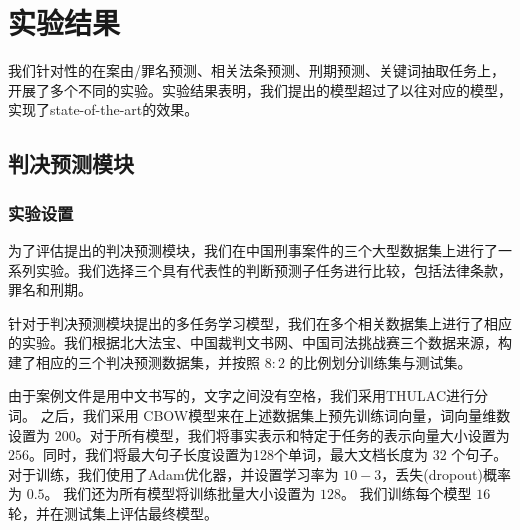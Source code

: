\chapter{实验结果}
\label{cha:result}

我们针对性的在案由/罪名预测、相关法条预测、刑期预测、关键词抽取任务上，开展了多个不同的实验。实验结果表明，我们提出的模型超过了以往对应的模型，实现了state-of-the-art的效果。

\section{判决预测模块}
\subsection{实验设置}
为了评估提出的判决预测模块，我们在中国刑事案件的三个大型数据集上进行了一系列实验。我们选择三个具有代表性的判断预测子任务进行比较，包括法律条款，罪名和刑期。

针对于判决预测模块提出的多任务学习模型，我们在多个相关数据集上进行了相应的实验。我们根据北大法宝、中国裁判文书网、中国司法挑战赛三个数据来源，构建了相应的三个判决预测数据集，并按照 $8:2$ 的比例划分训练集与测试集。

由于案例文件是用中文书写的，文字之间没有空格，我们采用THULAC\cite{sun2016thulac}进行分词。 之后，我们采用 CBOW模型\cite{mikolov2013distributed}来在上述数据集上预先训练词向量，词向量维数设置为 $200$。对于所有模型，我们将事实表示和特定于任务的表示向量大小设置为 $256$。同时，我们将最大句子长度设置为128个单词，最大文档长度为 $32$ 个句子。对于训练，我们使用了Adam优化器，并设置学习率为 $10-3$，丢失(dropout)概率为 $0.5$。 我们还为所有模型将训练批量大小设置为 $128$。 我们训练每个模型 $16$轮，并在测试集上评估最终模型。

